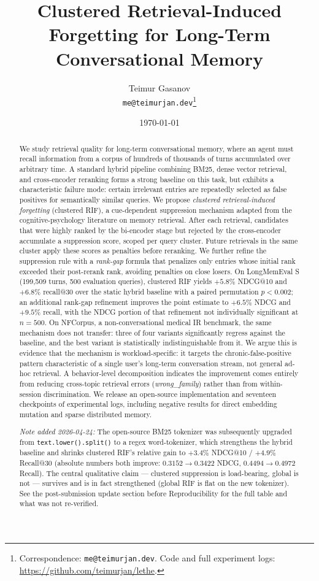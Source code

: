 \documentclass[11pt,a4paper]{article}
\title{Clustered Retrieval-Induced Forgetting for Long-Term\\Conversational Memory}
\author{%
  Teimur Gasanov\\
  \texttt{me@teimurjan.dev}\footnote{Correspondence: \texttt{me@teimurjan.dev}. Code and full experiment logs: \url{https://github.com/teimurjan/lethe}.}
}
\date{\today}
\begin{document}
\maketitle

\begin{abstract}
We study retrieval quality for long-term conversational memory, where an agent must recall information from a corpus of hundreds of thousands of turns accumulated over arbitrary time. A standard hybrid pipeline combining BM25, dense vector retrieval, and cross-encoder reranking forms a strong baseline on this task, but exhibits a characteristic failure mode: certain irrelevant entries are repeatedly selected as false positives for semantically similar queries. We propose \emph{clustered retrieval-induced forgetting} (clustered RIF), a cue-dependent suppression mechanism adapted from the cognitive-psychology literature on memory retrieval. After each retrieval, candidates that were highly ranked by the bi-encoder stage but rejected by the cross-encoder accumulate a suppression score, scoped per query cluster. Future retrievals in the same cluster apply these scores as penalties before reranking. We further refine the suppression rule with a \emph{rank-gap} formula that penalizes only entries whose initial rank exceeded their post-rerank rank, avoiding penalties on close losers. On LongMemEval S (199{,}509 turns, 500 evaluation queries), clustered RIF yields $+5.8\%$ NDCG@10 and $+6.8\%$ recall@30 over the static hybrid baseline with a paired permutation $p < 0.002$; an additional rank-gap refinement improves the point estimate to $+6.5\%$ NDCG and $+9.5\%$ recall, with the NDCG portion of that refinement not individually significant at $n=500$. On NFCorpus, a non-conversational medical IR benchmark, the same mechanism does not transfer: three of four variants significantly regress against the baseline, and the best variant is statistically indistinguishable from it. We argue this is evidence that the mechanism is workload-specific: it targets the chronic-false-positive pattern characteristic of a single user's long-term conversation stream, not general ad-hoc retrieval. A behavior-level decomposition indicates the improvement comes entirely from reducing cross-topic retrieval errors (\emph{wrong\_family}) rather than from within-session discrimination. We release an open-source implementation and seventeen checkpoints of experimental logs, including negative results for direct embedding mutation and sparse distributed memory.

\noindent\emph{Note added 2026-04-24:} The open-source BM25 tokenizer was subsequently upgraded from \texttt{text.lower().split()} to a regex word-tokenizer, which strengthens the hybrid baseline and shrinks clustered RIF's relative gain to $+3.4\%$ NDCG@10 / $+4.9\%$ Recall@30 (absolute numbers both improve: $0.3152 \to 0.3422$ NDCG, $0.4494 \to 0.4972$ Recall). The central qualitative claim — clustered suppression is load-bearing, global is not — survives and is in fact strengthened (global RIF is flat on the new tokenizer). See the post-submission update section before Reproducibility for the full table and what was not re-verified.
\end{abstract}
\end{document}
